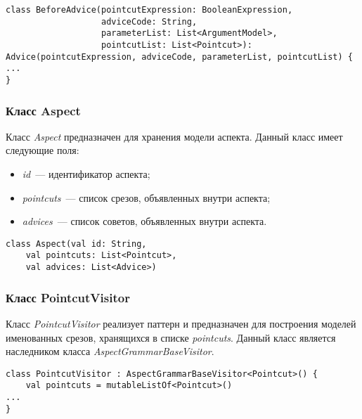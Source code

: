 \begin{lstlisting}[style={java}, label={lst:BeforeAdvice},
  caption={Класс BeforeAdvice}]
class BeforeAdvice(pointcutExpression: BooleanExpression,
                   adviceCode: String,
                   parameterList: List<ArgumentModel>,
                   pointcutList: List<Pointcut>): Advice(pointcutExpression, adviceCode, parameterList, pointcutList) {
...
}
\end{lstlisting}
\subsubsection{Класс Aspect}
\label{ssub:Aspect}
Класс \textit{Aspect} предназначен для хранения модели аспекта.
Данный класс имеет следующие поля:
\begin{itemize}
	\item \textit{id}~--- идентификатор аспекта;
	\item \textit{pointcuts}~--- список срезов, объявленных внутри аспекта;
	\item \textit{advices}~--- список советов, объявленных внутри аспекта.
\end{itemize}

\begin{lstlisting}[style={java}, label={lst:Aspect},
  caption={Класс Aspect}]
class Aspect(val id: String,
	val pointcuts: List<Pointcut>,
	val advices: List<Advice>)
\end{lstlisting}
\subsubsection{Класс PointcutVisitor}
\label{ssub:PointcutVisitor}
Класс \textit{PointcutVisitor} реализует паттерн  и
предназначен для построения моделей именованных срезов, хранящихся в списке
\textit{pointcuts}.
Данный класс является наследником класса \textit{AspectGrammarBaseVisitor}.

\begin{lstlisting}[style={java}, label={lst:PointcutVisitor},
  caption={Класс PointcutVisitor}]
class PointcutVisitor : AspectGrammarBaseVisitor<Pointcut>() {
    val pointcuts = mutableListOf<Pointcut>()
...
}
\end{lstlisting}
